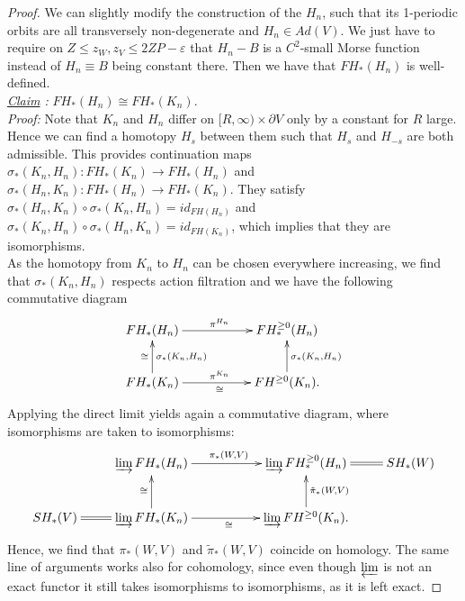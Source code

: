 \documentclass[a4paper,12pt,bibliography=totocnumbered,titlepage=false,abstracton,bookmarksnumbered=true]{scrartcl}
\newcommand{\veps}{\varepsilon}
\theoremstyle{definition}
\begin{document}
\begin{proof}
 We can slightly modify the construction of the $H_n$, such that its 1-periodic orbits are all transversely non-degenerate and $H_n\in Ad(V)$. We just have to require on $Z\leq z_W,z_V\leq 2ZP-\veps$ that $H_n- B$ is a $C^2$-small Morse function instead of $H_n\equiv B$ being constant there. Then we have that $FH_\ast(H_n)$ is well-defined.\medskip\\
 \emph{\underline{Claim} :} $FH_\ast(H_n)\cong FH_\ast(K_n)$.\\
 \emph{Proof:} Note that $K_n$ and $H_n$ differ on $[R,\infty)\times\partial V$ only by a constant for $R$ large. Hence we can find a homotopy $H_s$ between them such that $H_s$ and $H_{-s}$ are both admissible. This provides continuation maps $\sigma_\ast(K_n,H_n): FH_\ast(K_n)\rightarrow FH_\ast(H_n)$ and \linebreak $\sigma_\ast(H_n,K_n): FH_\ast(H_n)\rightarrow FH_\ast(K_n)$. They satisfy $\sigma_\ast(H_n,K_n)\circ\sigma_\ast(K_n,H_n)=id_{FH(H_n)}$ and $\sigma_\ast(K_n,H_n)\circ\sigma_\ast(H_n,K_n)=id_{FH(K_n)}$, which implies that they are isomorphisms.\medskip\\
 As the homotopy from $K_n$ to $H_n$ can be chosen everywhere increasing, we find that $\sigma_\ast(K_n,H_n)$ respects action filtration and we have the following commutative diagram
 \[\begin{xy}\xymatrix{FH_\ast(H_n)\ar[rr]^{\pi^{H_n}} && FH_\ast^{\geq0}(H_n)\\
  FH_\ast(K_n) \ar[u]^\cong_{\sigma_\ast(K_n,H_n)} \ar[rr]^{\pi^{K_n}}_\cong && FH^{\geq 0}(K_n). \ar[u]_{\sigma_\ast(K_n,H_n)}}\end{xy}\]
 Applying the direct limit yields again a commutative diagram, where isomorphisms are taken to isomorphisms:
 \[\begin{xy}\xymatrix{&\varinjlim FH_\ast(H_n)\ar[rr]^{\pi_\ast(W,V)} && \varinjlim FH_\ast^{\geq0}(H_n)\ar@{=}[r] & SH_\ast(W)\\
  SH_\ast(V)\ar@{=}[r] &\varinjlim FH_\ast(K_n) \ar[u]^\cong \ar[rr]_{\cong} &&\varinjlim FH^{\geq 0}(K_n). \ar[u]_{\tilde{\pi}_\ast(W,V)}}\end{xy}\]
  Hence, we find that $\pi_\ast(W,V)$ and $\tilde{\pi}_\ast(W,V)$ coincide on homology. The same line of arguments works also for cohomology, since even though $\varprojlim$ is not an exact functor it still takes isomorphisms to isomorphisms, as it is left exact.
\end{proof}
\end{document}
